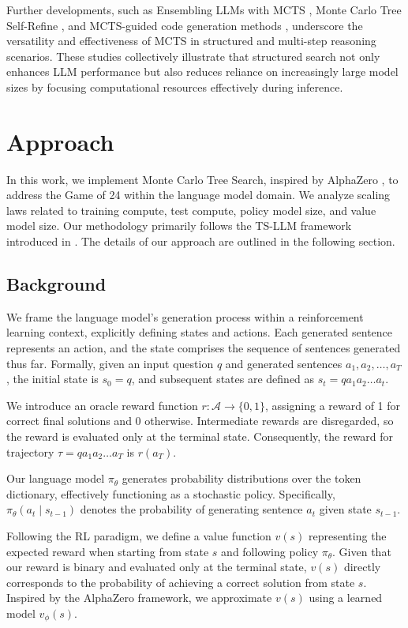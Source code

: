 \documentclass{article}
\begin{document}
Further developments, such as Ensembling LLMs with MCTS \cite{park2024ensemble}, Monte Carlo Tree Self-Refine \cite{zhang2024accessing}, and MCTS-guided code generation methods \cite{dainese2024generating}, underscore the versatility and effectiveness of MCTS in structured and multi-step reasoning scenarios. These studies collectively illustrate that structured search not only enhances LLM performance but also reduces reliance on increasingly large model sizes by focusing computational resources effectively during inference.

\section{Approach}
In this work, we implement Monte Carlo Tree Search, inspired by AlphaZero \cite{silver2017mastering}, to address the Game of 24 within the language model domain. We analyze scaling laws related to training compute, test compute, policy model size, and value model size. Our methodology primarily follows the TS-LLM framework introduced in \cite{feng2023alphazero}. The details of our approach are outlined in the following section.


\subsection{Background}
We frame the language model's generation process within a reinforcement learning context, explicitly defining states and actions. Each generated sentence represents an action, and the state comprises the sequence of sentences generated thus far. Formally, given an input question \(q\) and generated sentences \(a_1, a_2, \ldots, a_T\), the initial state is \(s_0 = q\), and subsequent states are defined as \(s_t = q a_1 a_2 \ldots a_t\).

We introduce an oracle reward function \(r: \mathcal{A} \rightarrow \{0, 1\}\), assigning a reward of 1 for correct final solutions and 0 otherwise. Intermediate rewards are disregarded, so the reward is evaluated only at the terminal state. Consequently, the reward for trajectory \(\tau = q a_1 a_2 \ldots a_T\) is \(r(a_T)\).

Our language model \(\pi_\theta\) generates probability distributions over the token dictionary, effectively functioning as a stochastic policy. Specifically, \(\pi_\theta(a_t \mid s_{t-1})\) denotes the probability of generating sentence \(a_t\) given state \(s_{t-1}\).

Following the RL paradigm, we define a value function \(v(s)\) representing the expected reward when starting from state \(s\) and following policy \(\pi_\theta\). Given that our reward is binary and evaluated only at the terminal state, \(v(s)\) directly corresponds to the probability of achieving a correct solution from state \(s\). Inspired by the AlphaZero framework, we approximate \(v(s)\) using a learned model \(v_\phi(s)\).
\end{document}
